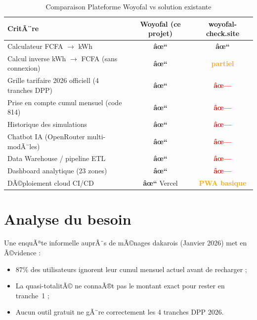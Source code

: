\documentclass[12pt,a4paper]{report}
\begin{document}
\begin{table}[h!]
\centering
\caption{Comparaison Plateforme Woyofal vs solution existante}
\label{tab:comparatif}
\begin{tabularx}{\textwidth}{X c c}
\toprule
\rowcolor{marine!10}
CritÃ¨re & \textbf{Woyofal (ce projet)} & woyofal-check.site \\
\midrule
Calculateur FCFA $\rightarrow$ kWh & \textcolor{green!60!black}{\textbf{âœ“}} & \textcolor{green!60!black}{\textbf{âœ“}} \\
Calcul inverse kWh $\rightarrow$ FCFA (sans connexion) & \textcolor{green!60!black}{\textbf{âœ“}} & \textcolor{orange}{\textbf{partiel}} \\
Grille tarifaire 2026 officiell (4 tranches DPP) & \textcolor{green!60!black}{\textbf{âœ“}} & \textcolor{red}{\textbf{âœ—}} \\
Prise en compte cumul mensuel (code 814) & \textcolor{green!60!black}{\textbf{âœ“}} & \textcolor{red}{\textbf{âœ—}} \\
Historique des simulations & \textcolor{green!60!black}{\textbf{âœ“}} & \textcolor{red}{\textbf{âœ—}} \\
Chatbot IA (OpenRouter multi-modÃ¨les) & \textcolor{green!60!black}{\textbf{âœ“}} & \textcolor{red}{\textbf{âœ—}} \\
Data Warehouse / pipeline ETL & \textcolor{green!60!black}{\textbf{âœ“}} & \textcolor{red}{\textbf{âœ—}} \\
Dashboard analytique (23 zones) & \textcolor{green!60!black}{\textbf{âœ“}} & \textcolor{red}{\textbf{âœ—}} \\
DÃ©ploiement cloud CI/CD & \textcolor{green!60!black}{\textbf{âœ“}} Vercel & \textcolor{orange}{\textbf{PWA basique}} \\
\bottomrule
\end{tabularx}
\end{table}

\section{Analyse du besoin}

Une enquÃªte informelle auprÃ¨s de mÃ©nages dakarois (Janvier 2026) met en Ã©vidence :
\begin{itemize}
  \item 87\% des utilisateurs ignorent leur cumul mensuel actuel avant de recharger ;
  \item La quasi-totalitÃ© ne connaÃ®t pas le montant exact pour rester en tranche~1 ;
  \item Aucun outil gratuit ne gÃ¨re correctement les 4 tranches DPP 2026.
\end{itemize}
\end{document}
